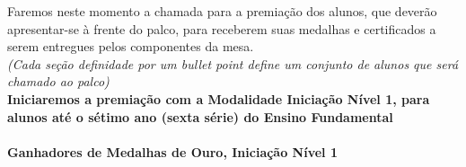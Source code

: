 \documentclass{article}
\begin{document}
\setlength{\parindent}{0pt}

Faremos neste momento a chamada para a premiação dos alunos, que deverão apresentar-se à frente do palco, para receberem suas medalhas e certificados a serem entregues pelos componentes da mesa.\\
\textit{(Cada seção definidade por um bullet point define um conjunto de alunos que será chamado ao palco)}\\

\color{blue}
\textbf{Iniciaremos a premiação com a Modalidade Iniciação Nível 1, para alunos até o sétimo ano (sexta série) do Ensino Fundamental}\\\\
\textbf{\color{blue}Ganhadores de Medalhas de Ouro, \color{black}Iniciação Nível 1}
\color{black}
\end{document}
